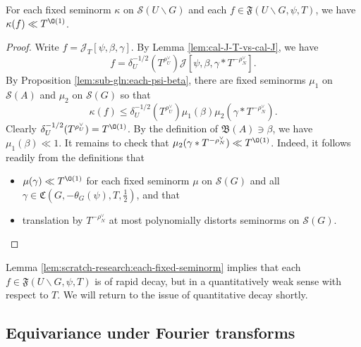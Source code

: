 \begin{lemma}\label{lem:scratch-research:each-fixed-seminorm}
  For each fixed seminorm $\kappa$ on $\mathcal{S}(U \backslash G)$ and each $f \in \mathfrak{F}(U \backslash G, \psi, T)$, we have $\kappa(f) \ll T^{\O(1)}$.
\end{lemma}
\begin{proof}
  Write $f = \mathcal{J}_T[\psi,\beta,\gamma]$.  By Lemma \ref{lem:cal-J-T-vs-cal-J}, we have
  \begin{equation*}
    f = \delta_U^{-1/2}(T^{\rho_U^\vee}) \mathcal{J}[\psi,\beta, \gamma \ast T^{-\rho_N^\vee}].
  \end{equation*}
  By Proposition \ref{lem:sub-gln:each-psi-beta}, there are fixed seminorms $\mu_1$ on $\mathcal{S}(A)$ and $\mu_2$ on $\mathcal{S}(G)$ so that
  \begin{equation*}
    \kappa(f) \leq \delta_U^{-1/2}(T^{\rho_U^\vee}) \mu_1(\beta) \mu_2(\gamma \ast T^{-\rho_N^\vee}).
  \end{equation*}
  Clearly $\delta_U^{-1/2}(T^{\rho_U^\vee}) = T^{\O(1)}$.  By the definition of $\mathfrak{B}(A) \ni \beta$, we have $\mu_1(\beta) \ll 1$.  It remains to check that $\mu_2(\gamma \ast T^{-\rho_N^\vee}) \ll T^{\O(1)}$.  Indeed, it follows readily from the definitions that
  \begin{itemize}
  \item  $\mu(\gamma) \ll T^{\O(1)}$ for each fixed seminorm $\mu$ on $\mathcal{S}(G)$ and all $\gamma \in \mathfrak{C}(G,-\theta_G(\psi),T,\tfrac{1}{2})$, and that
  \item  translation by $T^{-\rho_N^\vee}$ at most polynomially distorts seminorms on $\mathcal{S}(G)$.
  \end{itemize}
\end{proof}
Lemma \ref{lem:scratch-research:each-fixed-seminorm} implies that each $f \in \mathfrak{F}(U \backslash G, \psi, T)$ is of rapid decay, but in a quantitatively weak sense with respect to $T$.  We will return to the issue of quantitative decay shortly.




\subsection{Equivariance under Fourier transforms}


